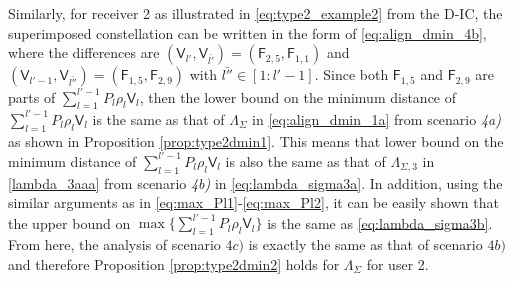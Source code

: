 \documentclass[12pt, draftclsnofoot, onecolumn]{IEEEtran}
\newcommand{\msf}[1]{\mathsf{#1}}
\theoremstyle{definition}
\begin{document}
Similarly, for receiver 2 as illustrated in \eqref{eq:type2_example2} from the D-IC, the superimposed constellation can be written in the form of \eqref{eq:align_dmin_4b}, where the differences are $(\msf{V}_{l'},\msf{V}_{\bar{l'}}) = (\msf{F}_{2,5},\msf{F}_{1,1})$ and $(\msf{V}_{l'-1},\msf{V}_{\bar{l''}}) = (\msf{F}_{1,5},\msf{F}_{2,9})$ with $\bar{l''} \in [1:l'-1]$. Since both $\msf{F}_{1,5}$ and $\msf{F}_{2,9}$ are parts of $ \sum_{l=1}^{l'-1}P_l\rho_l\msf{V}_l$, then the lower bound on the minimum distance of $\sum_{l=1}^{l'-1}P_l\rho_l\msf{V}_l$ is the same as that of $\Lambda_{\Sigma}$ in \eqref{eq:align_dmin_1a} from scenario \emph{4a)} as shown in Proposition \ref{prop:type2dmin1}. This means that lower bound on the minimum distance of $\sum_{l=1}^{l'-1}P_l\rho_l\msf{V}_l$ is also the same as that of $\Lambda_{\Sigma,3}$ in \eqref{lambda_3aaa} from scenario \emph{4b)} in \eqref{eq:lambda_sigma3a}. In addition, using the similar arguments as in \eqref{eq:max_Pl1}-\eqref{eq:max_Pl2}, it can be easily shown that the upper bound on $\max\{\sum_{l=1}^{l'-1}P_l\rho_l\msf{V}_l\}$ is the same as \eqref{eq:lambda_sigma3b}. From here, the analysis of scenario $4c)$ is exactly the same as that of scenario $4b)$ and therefore Proposition \ref{prop:type2dmin2} holds for $\Lambda_{\Sigma}$ for user 2.






\end{document}

